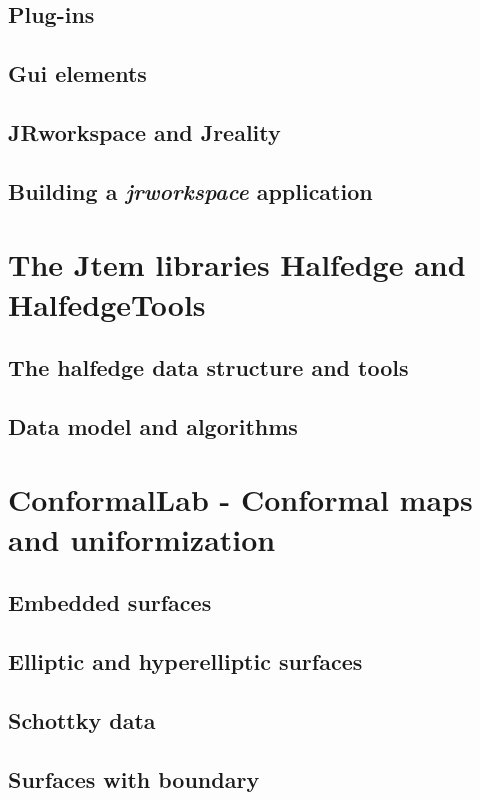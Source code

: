 \subsection{Plug-ins}
\subsection{Gui elements}
\subsection{{\sc JRworkspace} and {\sc Jreality}}
\subsection{Building a \emph{jrworkspace} application}

\section{The {\sc Jtem} libraries {\sc Halfedge} and {\sc HalfedgeTools}}
\label{sec:halfedge_halfedgetools}
\subsection{The halfedge data structure and tools}
\subsection{Data model and algorithms}

\section{{\sc ConformalLab} - Conformal maps and uniformization}
\label{sec:conformallab}
\subsection{Embedded surfaces}
\subsection{Elliptic and hyperelliptic surfaces}
\subsection{Schottky data}
\subsection{Surfaces with boundary}

